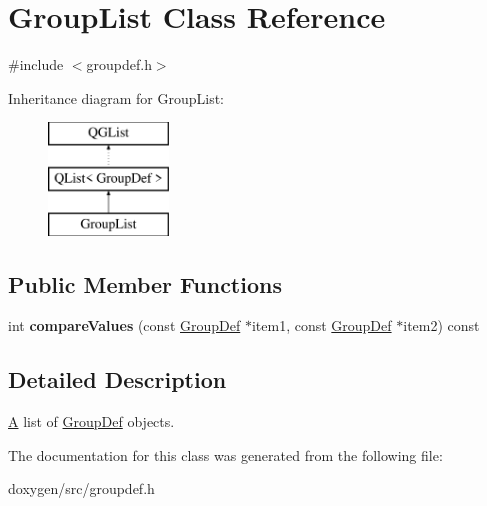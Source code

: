 \hypertarget{class_group_list}{}\section{Group\+List Class Reference}
\label{class_group_list}


{\ttfamily \#include $<$groupdef.\+h$>$}

Inheritance diagram for Group\+List\+:\begin{figure}[H]
\begin{center}
\leavevmode
\includegraphics[height=3.000000cm]{class_group_list}
\end{center}
\end{figure}
\subsection*{Public Member Functions}
\begin{DoxyCompactItemize}
\item 
\mbox{\label{class_group_list_a308a127321ba5ac826bf6aec1859dea5}} 
int {\bfseries compare\+Values} (const \mbox{\hyperlink{class_group_def}{Group\+Def}} $\ast$item1, const \mbox{\hyperlink{class_group_def}{Group\+Def}} $\ast$item2) const
\end{DoxyCompactItemize}


\subsection{Detailed Description}
\mbox{\hyperlink{class_a}{A}} list of \mbox{\hyperlink{class_group_def}{Group\+Def}} objects. 

The documentation for this class was generated from the following file\+:\begin{DoxyCompactItemize}
\item 
doxygen/src/groupdef.\+h\end{DoxyCompactItemize}
